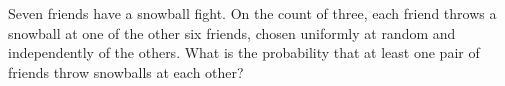 Seven friends have a snowball fight. On the count of three, each friend throws a snowball at one of the other six friends, chosen uniformly at random and independently of the others. What is the probability that at least one pair of friends throw snowballs at each other?
